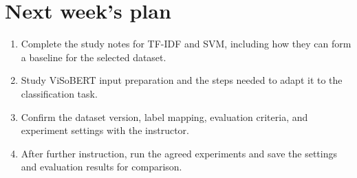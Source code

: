 \documentclass[11pt,a4paper]{article}
\begin{document}
\section{Next week's plan}
\begin{enumerate}[nosep,leftmargin=*]
\item Complete the study notes for TF-IDF and SVM, including how they can form a baseline for the selected dataset.
\item Study ViSoBERT input preparation and the steps needed to adapt it to the classification task.
\item Confirm the dataset version, label mapping, evaluation criteria, and experiment settings with the instructor.
\item After further instruction, run the agreed experiments and save the settings and evaluation results for comparison.
\end{enumerate}
\end{document}
